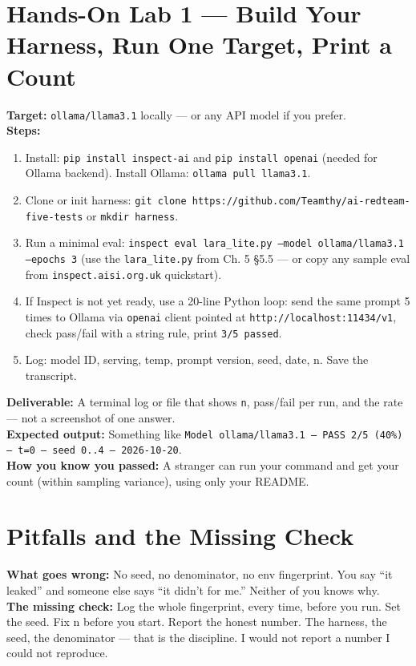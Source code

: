 \section{Hands-On Lab 1 — Build Your Harness, Run One Target, Print a Count}
\begin{labbox}
\textbf{Target:} \texttt{ollama/llama3.1} locally — or any API model if you prefer.\\[4pt]
\textbf{Steps:}
\begin{enumerate}
\item Install: \texttt{pip install inspect-ai} and \texttt{pip install openai} (needed for Ollama backend). Install Ollama: \texttt{ollama pull llama3.1}.
\item Clone or init harness: \texttt{git clone https://github.com/Teamthy/ai-redteam-five-tests} or \texttt{mkdir harness}.
\item Run a minimal eval: \texttt{inspect eval lara\_lite.py --model ollama/llama3.1 --epochs 3} (use the \texttt{lara\_lite.py} from Ch. 5 §5.5 — or copy any sample eval from \texttt{inspect.aisi.org.uk} quickstart).
\item If Inspect is not yet ready, use a 20-line Python loop: send the same prompt 5 times to Ollama via \texttt{openai} client pointed at \texttt{http://localhost:11434/v1}, check pass/fail with a string rule, print \texttt{3/5 passed}.
\item Log: model ID, serving, temp, prompt version, seed, date, n. Save the transcript.
\end{enumerate}
\textbf{Deliverable:} A terminal log or file that shows \texttt{n}, pass/fail per run, and the rate — not a screenshot of one answer.\\[2pt]
\textbf{Expected output:} Something like \texttt{Model ollama/llama3.1 — PASS 2/5 (40\%) — t=0 — seed 0..4 — 2026-10-20}.\\[2pt]
\textbf{How you know you passed:} A stranger can run your command and get your count (within sampling variance), using only your README.
\end{labbox}

\section{Pitfalls and the Missing Check}
\begin{pitfallbox}
\textbf{What goes wrong:} No seed, no denominator, no env fingerprint. You say ``it leaked'' and someone else says ``it didn't for me.'' Neither of you knows why.\\[4pt]
\textbf{The missing check:} Log the whole fingerprint, every time, before you run. Set the seed. Fix n before you start. Report the honest number. The harness, the seed, the denominator — that is the discipline. I would not report a number I could not reproduce.
\end{pitfallbox}

